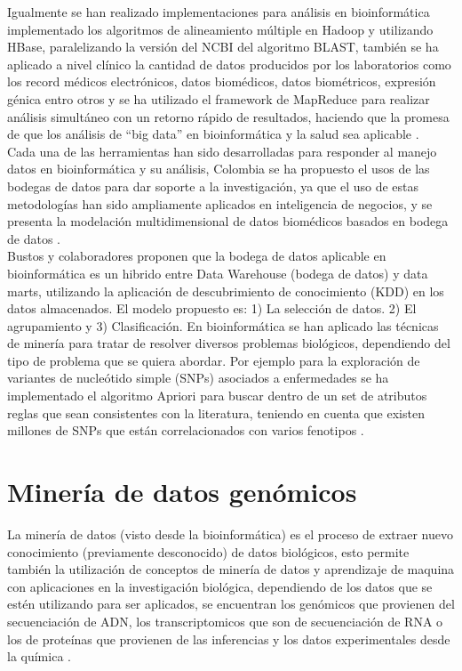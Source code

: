 {Igualmente se han realizado implementaciones para análisis  en bioinformática implementado los algoritmos de alineamiento múltiple en Hadoop  y utilizando HBase, paralelizando la versión del NCBI del algoritmo BLAST, también se ha aplicado a nivel clínico la cantidad de datos producidos por los laboratorios como los record médicos electrónicos, datos biomédicos, datos biométricos, expresión génica entro otros y  se ha utilizado el framework de MapReduce para realizar análisis simultáneo con un retorno rápido de resultados, haciendo que la promesa de que los análisis de “big data”  en bioinformática y la salud sea aplicable \cite{Mohammed2014}.\\

Cada una de las herramientas han sido desarrolladas para responder al manejo datos en bioinformática y su análisis,  Colombia se ha propuesto el usos de las bodegas de datos para dar soporte a la investigación, ya que el uso de estas metodologías han sido ampliamente aplicados en inteligencia de negocios, y se presenta la modelación multidimensional de datos biomédicos basados en bodega de datos \cite{Bustos2007}.\\

Bustos \cite{Bustos2007}  y colaboradores proponen que la bodega de datos aplicable en bioinformática es  un hibrido entre Data Warehouse (bodega de datos) y data marts, utilizando la aplicación de descubrimiento de conocimiento (KDD) en los datos almacenados. El modelo propuesto es: 1) La selección de datos. 2) El agrupamiento y 3) Clasificación. En bioinformática se han aplicado las técnicas de minería para tratar de resolver diversos problemas biológicos, dependiendo del tipo de problema que se quiera abordar. Por ejemplo para la exploración de variantes de nucleótido simple (SNPs) asociados a enfermedades se ha implementado el algoritmo Apriori para buscar dentro de un set de atributos reglas que sean consistentes con la literatura, teniendo en cuenta que existen millones de SNPs que están correlacionados con varios fenotipos \cite{Staccini2014}.

\section{Minería de datos genómicos}

La minería de datos (visto desde la bioinformática) es  el proceso de extraer nuevo conocimiento (previamente desconocido) de datos biológicos, esto permite también la utilización de conceptos de minería de datos y aprendizaje de maquina  con aplicaciones en la investigación biológica, dependiendo de los datos que se estén utilizando para ser aplicados, se encuentran los genómicos que provienen del secuenciación de ADN, los transcriptomicos que son de secuenciación de RNA o los de proteínas que provienen de las inferencias y los datos experimentales desde la química \cite{Farid2016}. \\ 

}
